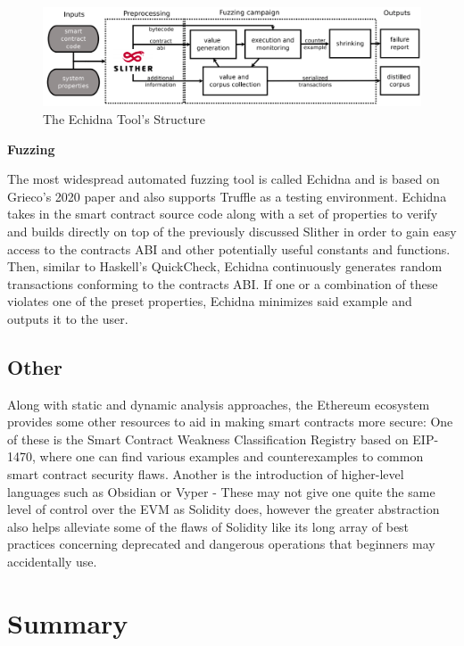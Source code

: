 \documentclass[letterpaper,twocolumn,10pt]{article}
\begin{document}
\begin{figure}
\begin{center}
\includegraphics[scale=0.16]{echidna}
\end{center}
\caption{\label{fig:echidna} The Echidna Tool's Structure}
\end{figure}



{\noindent \bf Fuzzing}


\noindent The most widespread automated fuzzing tool is called Echidna and is based on Grieco's 2020 paper and also supports Truffle as a testing environment. Echidna takes in the smart contract source code along with a set of properties to verify and builds directly on top of the previously discussed Slither in order to gain easy access to the contracts ABI and other potentially useful constants and functions. Then, similar to Haskell's QuickCheck, Echidna continuously generates random transactions conforming to the contracts ABI. If one or a combination of these violates one of the preset properties,  Echidna minimizes said example and outputs it to the user.

\subsection{Other}
Along with static and dynamic analysis approaches, the Ethereum ecosystem provides some other resources to aid in making smart contracts more secure: One of these is the Smart Contract Weakness Classification Registry based on EIP-1470, where one can find various examples and counterexamples to common smart contract security flaws. Another is the introduction of higher-level languages such as Obsidian or Vyper - These may not give one quite the same level of control over the EVM as Solidity does, however the greater abstraction also helps alleviate some of the flaws of Solidity like its long array of best practices concerning deprecated and dangerous operations that beginners may accidentally use.

\section{Summary}
\end{document}
